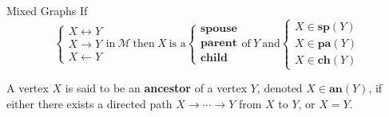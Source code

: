 \documentclass[english, compress, red]{beamer}
\begin{document}
\begin{frame}{Mixed Graphs}
	If
	\begin{equation*}
			\begin{cases}
				X \leftrightarrow Y \\
				X \rightarrow Y \\
				X \leftarrow Y
			\end{cases}
			\text{in} ~\mathcal{M} ~\text{then} ~X ~\text{is a}
			\begin{cases}
				\textbf{spouse} \\
				\textbf{parent} \\
				\textbf{child}
			\end{cases}
			\text{of} ~Y ~\text{and}
			\begin{cases}
				X \in \textbf{sp}(Y) \\
				X \in \textbf{pa}(Y) \\
				X \in \textbf{ch}(Y)
			\end{cases}
	\end{equation*}
	
	\begin{definition}
		A vertex $X$ is said to be an \textbf{ancestor} of a vertex $Y$, denoted $X \in \textbf{an}(Y)$, if either there exists a directed path $X \rightarrow \cdots \rightarrow Y$ from $X$ to $Y$, or $X=Y$.
	\end{definition}
\end{frame}
\end{document}
